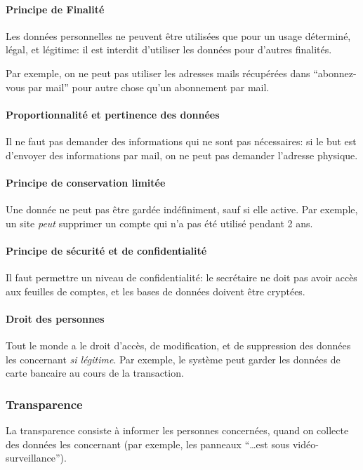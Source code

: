 \documentclass[10pt,a4paper,french]{article}
\begin{document}
\paragraph{Principe de Finalité}
Les données personnelles ne peuvent être utilisées que pour un usage déterminé, légal, et légitime: il est interdit d'utiliser les données pour d'autres finalités.

Par exemple, on ne peut pas utiliser les adresses mails récupérées dans ``abonnez-vous par mail'' pour autre chose qu'un abonnement par mail.

\paragraph{Proportionnalité et pertinence des données}
Il ne faut pas demander des informations qui ne sont pas nécessaires: si le but est d'envoyer des informations par mail, on ne peut pas demander l'adresse physique.

\paragraph{Principe de conservation limitée}
Une donnée ne peut pas être gardée indéfiniment, sauf si elle active.
Par exemple, un site \textit{peut} supprimer un compte qui n'a pas été utilisé pendant 2 ans.

\paragraph{Principe de sécurité et de confidentialité}
Il faut permettre un niveau de confidentialité: le secrétaire ne doit pas avoir accès aux feuilles de comptes, et les bases de données doivent être cryptées.

\paragraph{Droit des personnes}
Tout le monde a le droit d'accès, de modification, et de suppression des données les concernant \textit{si légitime}. Par exemple, le système peut garder les données de carte bancaire au cours de la transaction.

\subsubsection{Transparence}

La transparence consiste à informer les personnes concernées, quand on collecte des données les concernant (par exemple, les panneaux ``\ldots est sous vidéo-surveillance'').
\end{document}
